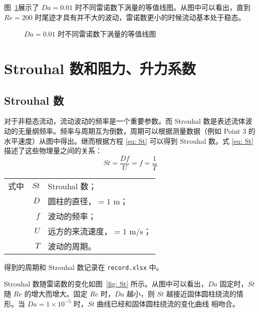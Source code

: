 图~\ref{fig: vorticity-contour-1e-2}展示了 $Da=0.01$ 时不同雷诺数下涡量的等值线图。从图中可以看出，直到 $Re=200$ 时尾迹才具有并不大的波动，雷诺数更小的时候流动基本处于稳态。

\begin{figure}
	\centering
	\begin{minipage}{\textwidth}
		\centering
	\end{minipage}
	\centering
	\begin{minipage}{\textwidth}
		\centering
	\end{minipage}
	\caption{$Da=0.01$ 时不同雷诺数下涡量的等值线图}
	\label{fig: vorticity-contour-1e-2}
\end{figure}

\section{Strouhal 数和阻力、升力系数}

\subsection{Strouhal 数}

对于非稳态流动，流动波动的频率是一个重要参数。而 Strouhal 数是表述流体波动的无量纲频率。频率与周期互为倒数，周期可以根据测量数据（例如 Point 3 的水平速度）从图中得出。继而根据方程 \eqref{eq: St} 可以得到 Strouhal 数。式 \eqref{eq: St} 描述了这些物理量之间的关系：
\begin{equation}\label{eq: St}
	St = \frac{Df}{U} = f = \frac{1}{T}
\end{equation}
\begin{tabularx}{\textwidth}{@{}l@{\quad}r@{——}X@{}}
	式中 & $St$ & Strouhal 数；\\
		& $D$ & 圆柱的直径，$=1$ m；\\
		& $f$ & 波动的频率；\\
		& $U$ & 远方的来流速度，$=1$ m/s；\\
		& $T$ & 波动的周期。 
\end{tabularx}\vspace{3.15bp}
得到的周期和 Strouhal 数记录在 \texttt{record.xlsx} 中。

Strouhal 数随雷诺数的变化如图~\ref{fig: St} 所示。从图中可以看出，$Da$ 固定时，$St$ 随 $Re$ 的增大而增大。固定 $Re$ 时，$Da$ 越小，则 $St$ 越接近固体圆柱绕流的情形。当 $Da=1 \times 10^{-5}$ 时，$St$ 曲线已经和固体圆柱绕流的变化曲线 \cite{} 相吻合。


